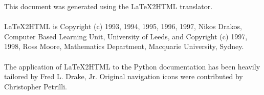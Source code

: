 
This document was generated using the LaTeX2HTML translator.\\
\\

LaTeX2HTML is Copyright (c) 1993, 1994, 1995, 1996, 1997, Nikos Drakos,
Computer Based Learning Unit, University of Leeds, and Copyright (c) 1997, 1998,
Ross Moore, Mathematics Department, Macquarie University, Sydney.\\
\\

The application of LaTeX2HTML to the Python documentation has been heavily
tailored by Fred L. Drake, Jr. Original navigation icons were contributed by
Christopher Petrilli.


